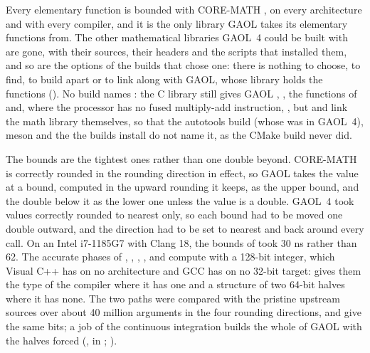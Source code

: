 Every elementary function is bounded with CORE-MATH \cite{CoreMath:2022}, on
every architecture and with every compiler, and it is the only library GAOL
takes its elementary functions from.\newinvfive{} The other mathematical
libraries GAOL~4 could be built with are gone, with their sources, their
headers and the scripts that installed them, and so are the options of the
builds that chose one: there is nothing to choose, to find, to build apart or
to link along with GAOL, whose library holds the functions
(). No build names : the C library
still gives GAOL , , the functions of
 and, where the processor has no fused multiply-add
instruction, , but  and  link the math
library themselves, so that the autotools build (whose  was
 in GAOL~4), meson and the  the builds install do
not name it, as the CMake build never did.

\medskip
The bounds are the tightest ones rather than one double beyond. CORE-MATH is
correctly rounded in the rounding direction in effect, so GAOL takes the
value at a bound, computed in the upward rounding it keeps, as the upper
bound, and the double below it as the lower one unless the value is a double. GAOL~4 took values correctly
rounded to nearest only, so each bound had to be moved one double outward,
and the direction had to be set to nearest and back around every call. On an
Intel i7-1185G7 with Clang 18, the bounds of  took 30 ns rather
than 62. The accurate phases of ,
, , ,  and  compute with
a 128-bit integer, which Visual C++ has on no architecture and GCC has on no
32-bit target:  gives them the type of the
compiler where it has one and a structure of two 64-bit halves where it has
none. The two paths were compared with the pristine upstream sources over
about 40 million arguments in the four rounding directions, and give the same
bits; a job of the continuous integration builds the whole of GAOL with the
halves forced (, in ;
).

